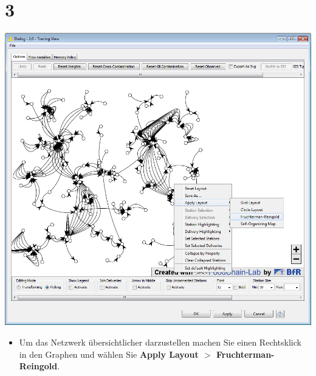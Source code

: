 \documentclass{beamer}
\begin{document}
\section{3}
\begin{frame}
	\begin{center}
  		\includegraphics[height=0.6\textheight]{3.png}
	\end{center}
	\begin{itemize}
		\item Um das Netzwerk übersichtlicher darzustellen machen Sie einen Rechtsklick in den Graphen und wählen Sie \textbf{Apply Layout $>$ Fruchterman-Reingold}.
	\end{itemize}
\end{frame}
\end{document}
